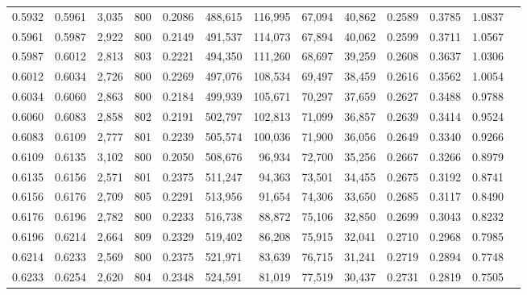 \begin{tabular}{rrrrrrrrrrrrr}
0.5932 & 0.5961 &  3,035 & 800 &                                     0.2086 & 488,615 & 116,995 &  67,094 &  40,862 & 0.2589 & 0.3785 & 1.0837 \\
0.5961 & 0.5987 &  2,922 & 800 &                                     0.2149 & 491,537 & 114,073 &  67,894 &  40,062 & 0.2599 & 0.3711 & 1.0567 \\
0.5987 & 0.6012 &  2,813 & 803 &                                     0.2221 & 494,350 & 111,260 &  68,697 &  39,259 & 0.2608 & 0.3637 & 1.0306 \\
0.6012 & 0.6034 &  2,726 & 800 &                                     0.2269 & 497,076 & 108,534 &  69,497 &  38,459 & 0.2616 & 0.3562 & 1.0054 \\
0.6034 & 0.6060 &  2,863 & 800 &                                     0.2184 & 499,939 & 105,671 &  70,297 &  37,659 & 0.2627 & 0.3488 & 0.9788 \\
0.6060 & 0.6083 &  2,858 & 802 &                                     0.2191 & 502,797 & 102,813 &  71,099 &  36,857 & 0.2639 & 0.3414 & 0.9524 \\
0.6083 & 0.6109 &  2,777 & 801 &                                     0.2239 & 505,574 & 100,036 &  71,900 &  36,056 & 0.2649 & 0.3340 & 0.9266 \\
0.6109 & 0.6135 &  3,102 & 800 &                                     0.2050 & 508,676 &  96,934 &  72,700 &  35,256 & 0.2667 & 0.3266 & 0.8979 \\
0.6135 & 0.6156 &  2,571 & 801 &                                     0.2375 & 511,247 &  94,363 &  73,501 &  34,455 & 0.2675 & 0.3192 & 0.8741 \\
0.6156 & 0.6176 &  2,709 & 805 &                                     0.2291 & 513,956 &  91,654 &  74,306 &  33,650 & 0.2685 & 0.3117 & 0.8490 \\
0.6176 & 0.6196 &  2,782 & 800 &                                     0.2233 & 516,738 &  88,872 &  75,106 &  32,850 & 0.2699 & 0.3043 & 0.8232 \\
0.6196 & 0.6214 &  2,664 & 809 &                                     0.2329 & 519,402 &  86,208 &  75,915 &  32,041 & 0.2710 & 0.2968 & 0.7985 \\
0.6214 & 0.6233 &  2,569 & 800 &                                     0.2375 & 521,971 &  83,639 &  76,715 &  31,241 & 0.2719 & 0.2894 & 0.7748 \\
0.6233 & 0.6254 &  2,620 & 804 &                                     0.2348 & 524,591 &  81,019 &  77,519 &  30,437 & 0.2731 & 0.2819 & 0.7505 \\

\end{tabular}
